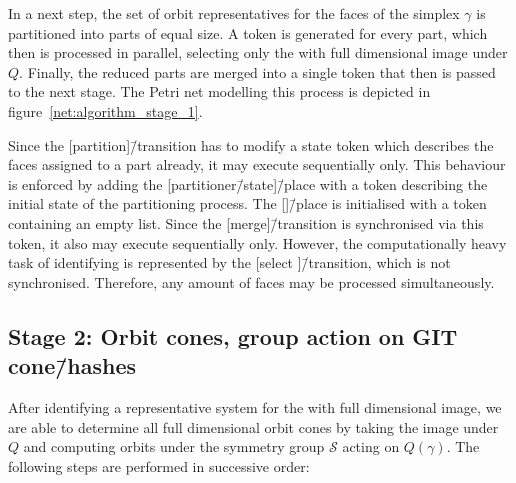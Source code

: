 In a next step, the set of orbit representatives for the faces of the simplex $\gamma$ is partitioned into parts of equal size. A token is generated for every part, which then is processed in parallel, selecting only the \afaces{} with full dimensional image under $Q$. Finally, the reduced parts are merged into a single token that then is passed to the next stage. The Petri net modelling this process is depicted in figure~\ref{net:algorithm_stage_1}.

Since the [partition]\=/transition has to modify a state token which describes the faces assigned to a part already, it may execute sequentially only. This behaviour is enforced by adding the [partitioner\=/state]\=/place with a token describing the initial state of the partitioning process.
The [\afaces]\=/place is initialised with a token containing an empty list. Since the [merge]\=/transition is synchronised via this token, it also may execute sequentially only. However, the computationally heavy task of identifying \afaces{} is represented by the [select \afaces{}]\=/transition, which is not synchronised. Therefore, any amount of faces may be processed simultaneously.



\subsection*{Stage 2: Orbit cones, group action on GIT cone\=/hashes}
After identifying a representative system for the \afaces{} with full dimensional image, we are able to determine all full dimensional orbit cones by taking the image under $Q$ and computing orbits under the symmetry group $\mathcal{S}$ acting on $Q(\gamma)$. The following steps are performed in successive order:

